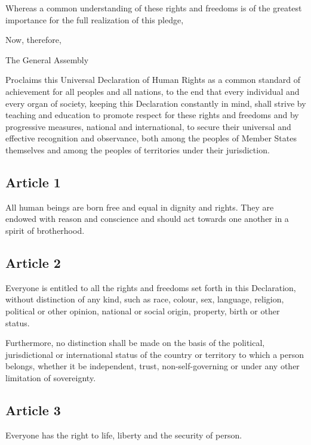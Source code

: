 \documentclass[
  titlepage,
  openright,
  DIV=calc,
  toc=listof,
  listof=nochaptergap]{scrbook}
\begin{document}
Whereas a common understanding of these rights and freedoms is of the
greatest importance for the full realization of this pledge,

Now, therefore,

The General Assembly

Proclaims this Universal Declaration of Human Rights as a common
standard of achievement for all peoples and all nations, to the end that
every individual and every organ of society, keeping this Declaration
constantly in mind, shall strive by teaching and education to promote
respect for these rights and freedoms and by progressive measures,
national and international, to secure their universal and effective
recognition and observance, both among the peoples of Member States
themselves and among the peoples of territories under their
jurisdiction.

\hypertarget{article-1-1}{%
\subsection{Article 1}\label{article-1-1}}

All human beings are born free and equal in dignity and rights. They are
endowed with reason and conscience and should act towards one another in
a spirit of brotherhood.

\hypertarget{article-2-1}{%
\subsection{Article 2}\label{article-2-1}}

Everyone is entitled to all the rights and freedoms set forth in this
Declaration, without distinction of any kind, such as race, colour, sex,
language, religion, political or other opinion, national or social
origin, property, birth or other status.

Furthermore, no distinction shall be made on the basis of the political,
jurisdictional or international status of the country or territory to
which a person belongs, whether it be independent, trust,
non-self-governing or under any other limitation of sovereignty.

\hypertarget{article-3-1}{%
\subsection{Article 3}\label{article-3-1}}

Everyone has the right to life, liberty and the security of person.
\end{document}
